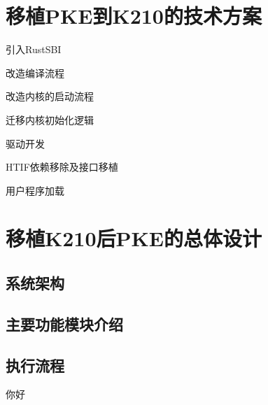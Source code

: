 \section{移植PKE到K210的技术方案}

引入RustSBI

改造编译流程

改造内核的启动流程

迁移内核初始化逻辑

驱动开发

HTIF依赖移除及接口移植

用户程序加载

\section{移植K210后PKE的总体设计}

\subsection{系统架构}

\subsection{主要功能模块介绍}

\subsection{执行流程}
你好
